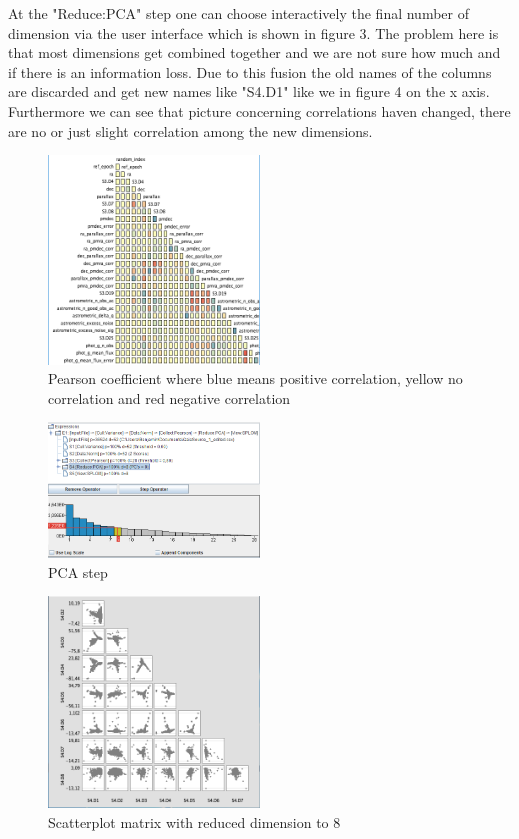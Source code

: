 \documentclass{vgtc}                          %
\begin{document}
At the "Reduce:PCA" step one can choose interactively the final number of dimension via the user interface which is shown in figure 3. The problem here is that most dimensions get combined together and we are not sure how much and if there is an information loss. Due to this fusion the old names of the columns are discarded and get new names like "S4.D1" like we in figure 4 on the x axis. Furthermore we can see that picture concerning correlations haven changed, there are no or just slight correlation among the new dimensions.
\begin{figure}[h]
\includegraphics[width=0.5\textwidth]{pearsoncoeff.PNG}
\centering
\caption{Pearson coefficient where blue means positive correlation, yellow no correlation and red negative correlation}
\end{figure}
\begin{figure}[h]
\includegraphics[width=0.5\textwidth]{pca.PNG}
\centering
\caption{PCA step}
\end{figure}
\begin{figure}
\includegraphics[width=0.5\textwidth]{splom.PNG}
\centering
\caption{Scatterplot matrix with reduced dimension to 8}
\end{figure}
\end{document}
